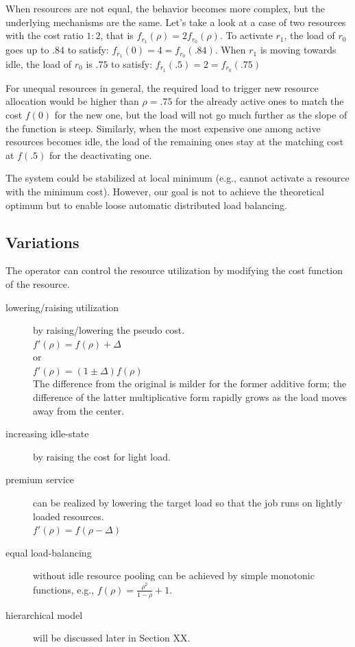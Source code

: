 When resources are not equal, the behavior becomes more complex, but
the underlying mechanisms are the same.
Let's take a look at a case of two resources with the cost ratio $1:2$,
that is $f_{r_1{}}(\rho) = 2 f_{r_{0}}(\rho)$.
To activate $r_{1}$, the load of $r_{0}$ goes up to $.84$ to satisfy:
$f_{r_{1}}(0) = 4 = f_{r_{0}}(.84)$.
When $r_{1}$ is moving towards idle, the load of $r_{0}$ is $.75$ to
satisfy: $f_{r_{1}}(.5) = 2 = f_{r_{0}}(.75)$

For unequal resources in general, the required load to trigger new
resource allocation would be higher than $\rho = .75$ for the already
active ones to match the cost $f(0)$ for the new one, but the load
will not go much further as the slope of the function is steep.
Similarly, when the most expensive one among active resources becomes
idle, the load of the remaining ones stay at the matching cost at
$f(.5)$ for the deactivating one.

The system could be stabilized at local minimum (e.g., cannot activate
a resource with the minimum cost).
However, our goal is not to achieve the theoretical optimum but to
enable loose automatic distributed load balancing.

\subsection{Variations}

The operator can control the resource utilization by modifying the cost
function of the resource.

\begin{description}
  \item[lowering/raising utilization] by raising/lowering the pseudo cost. \\
        $f'(\rho) = f(\rho) + \Delta$ \\
        or \\
        $f'(\rho) = (1 \pm \Delta)f(\rho)$ \\
        The difference from the original is milder for the former additive
        form; the difference of the latter multiplicative form rapidly grows
        as the load moves away from the center.

  \item[increasing idle-state] by raising the cost for light load.
  \item[premium service] can be realized by lowering the target load so
        that the job runs on lightly loaded resources. \\
        $f'(\rho) = f(\rho - \Delta)$
  \item[equal load-balancing] without idle resource pooling can be
        achieved by simple monotonic functions, e.g.,
        $f(\rho) = \frac{\rho^{2}}{1 - \rho} + 1$.
  \item[hierarchical model] will be discussed later in Section XX.
\end{description}


